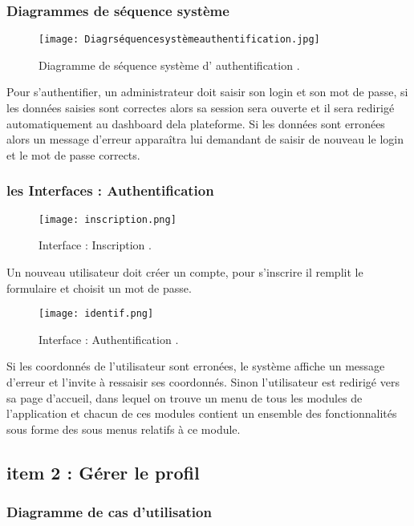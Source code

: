 \subsubsection{Diagrammes de séquence système }
\begin{figure}[ht]
	\centering
	\texttt{[image: Diagrséquencesystèmeauthentification.jpg]}
	\caption{Diagramme de séquence système d' authentification .}
	\label{fig:Diagramme de séquence système d' authentification }
\end{figure}
\FloatBarrier
Pour s’authentifier, un administrateur doit saisir son login et son mot de passe, si les
données saisies sont correctes alors sa session sera ouverte et il sera redirigé automatiquement au dashboard dela plateforme. Si les données sont erronées alors un message d’erreur
apparaîtra lui demandant de saisir de nouveau le login et le mot de passe corrects.
\clearpage
\subsubsection{les Interfaces : Authentification  }


\begin{figure}[ht]
	\centering
	\texttt{[image: inscription.png]}
	\caption{Interface : Inscription .}
	\label{fig:Interface : inscription }
\end{figure}
\FloatBarrier
Un nouveau utilisateur doit créer un compte, pour s’inscrire il remplit le formulaire et
choisit un mot de passe. 


\begin{figure}[ht]
	\centering
	\texttt{[image: identif.png]}
	\caption{Interface : Authentification .}
	\label{fig:Interface : Authentification }
\end{figure}
\FloatBarrier
Si les coordonnés de l’utilisateur sont erronées, le système affiche un message d’erreur et
l’invite à ressaisir ses coordonnés.
Sinon l’utilisateur est redirigé vers sa page d’accueil, dans lequel on trouve un menu de tous les
modules de l’application et chacun de ces modules contient un ensemble des fonctionnalités
sous forme des sous menus relatifs à ce module.
\clearpage
\subsection{item 2 : Gérer le profil}
\subsubsection{Diagramme de cas d’utilisation }



